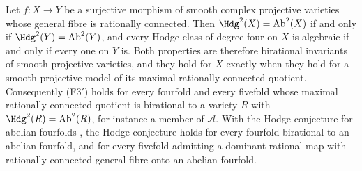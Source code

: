 \begin{proposition}
\label{prop:f3primefibration}
Let $f\colon X\to Y$ be a surjective morphism of smooth complex projective
varieties whose general fibre is rationally connected. Then
$\Hdg^{2}(X)=\mathrm{Ab}^{2}(X)$ if and only if
$\Hdg^{2}(Y)=\mathrm{Ab}^{2}(Y)$, and every Hodge class of degree four on $X$
is algebraic if and only if every one on $Y$ is. Both properties are
therefore birational invariants of smooth projective varieties, and they hold
for $X$ exactly when they hold for a smooth projective model of its maximal
rationally connected quotient. Consequently \textup{(F3$'$)} holds for every
fourfold and every fivefold whose maximal rationally connected quotient is
birational to a variety $R$ with $\Hdg^{2}(R)=\mathrm{Ab}^{2}(R)$, for
instance a member of $\mathcal{A}$. With the Hodge conjecture for abelian
fourfolds \cite{Mar25a,Mar25b}, the Hodge conjecture holds for every fourfold
birational to an abelian fourfold, and for every fivefold admitting a
dominant rational map with rationally connected general fibre onto an
abelian fourfold.
\end{proposition}

